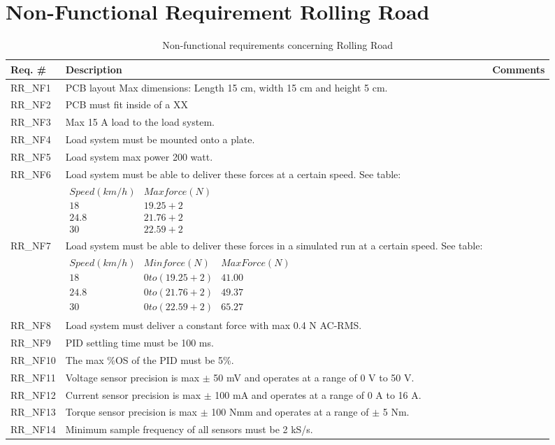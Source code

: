 \section{Non-Functional Requirement Rolling Road}

\begin{table}[h!]
	\label{FREQ_AU2}
	\centering
	\begin{tabular}{|p{2 cm}|p{10 cm}|p{2 cm}|}
		\hline
		\textbf{Req. \#} & \textbf{Description} & \textbf{Comments} \\\hline
		RR\_NF1
		& PCB layout Max dimensions: Length 15 cm, width 15 cm and height 5 cm. 
		&  \\ \hline
		RR\_NF2
		& PCB must fit inside of a XX 
		& \\ \hline
		RR\_NF3
		& Max 15 A load to the load system.
		& \\ \hline
		RR\_NF4
		& Load system must be mounted onto a plate. 
		& \\ \hline
		RR\_NF5
		& Load system max power 200 watt.
		& \\ \hline
		RR\_NF6 
		& Load system must be able to deliver these forces at a certain speed. See table: 
		& \\ &
		$\begin{array}{c|c}
			Speed (km/h) & Max force (N) \\ 
			18 & 19.25+2 \\ 
			24.8 & 21.76+2 \\ 
			30 & 22.59+2
		\end{array} $
		& \\ \hline
		RR\_NF7
		& Load system must be able to deliver these forces in a simulated run at a certain speed. See table:
		& \\ &
		$\begin{array}{c|c|c}
			Speed (km/h) & Min force (N) & Max Force (N) \\ 
			18 & 0 to (19.25+2) & 41.00 \\ 
			24.8 & 0 to (21.76+2) & 49.37 \\ 
			30 & 0 to (22.59+2) & 65.27
		\end{array}$
		& \\ \hline
		RR\_NF8
		& Load system must deliver a constant force with max 0.4 N AC-RMS. 
		& \\ \hline
		RR\_NF9
		& PID settling time must be 100 ms. 
		&  \\ \hline
		RR\_NF10
		& The max \%OS of the PID must be 5\%. 
		&  \\ \hline
		RR\_NF11
		& Voltage sensor precision is max $\pm$ 50 mV and operates at a range of 0 V to 50 V. 
		&  \\ \hline
		RR\_NF12
		& Current sensor precision is max $\pm$ 100 mA and operates at a range of 0 A to 16 A. 
		&  \\ \hline
		RR\_NF13
		& Torque sensor precision is max $\pm$ 100 Nmm and operates at a range of $\pm$ 5 Nm. 
		&  \\ \hline
		RR\_NF14
		& Minimum sample frequency of all sensors must be 2 kS/s.  
		&  \\ \hline
	\end{tabular}
	\caption{Non-functional requirements concerning Rolling Road}
\end{table}


